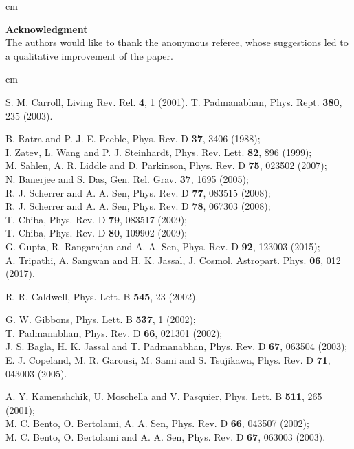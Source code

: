 \documentclass[11pt]{article}
\begin{document}
 cm


{\bf Acknowledgment}\\
The authors would like to thank the anonymous referee, whose suggestions led to a qualitative improvement of the paper.








 cm
\begin{thebibliography}{}

  
S. M. Carroll, Living Rev. Rel. {\bf 4}, 1 (2001).
T. Padmanabhan, Phys. Rept. {\bf 380}, 235 (2003).

B. Ratra and P. J. E. Peeble, Phys. Rev. D {\bf 37}, 3406 (1988);\\
               I. Zatev, L. Wang and P. J. Steinhardt, Phys. Rev. Lett. {\bf 82}, 896 (1999);\\
               M. Sahlen, A. R. Liddle and D. Parkinson, Phys. Rev. D {\bf 75}, 023502 (2007);\\
               N. Banerjee and S. Das, Gen. Rel. Grav. {\bf 37}, 1695 (2005); \\
               R. J. Scherrer and A. A. Sen, Phys. Rev. D {\bf 77}, 083515 (2008);\\
               R. J. Scherrer and A. A. Sen, Phys. Rev. D {\bf 78}, 067303 (2008);\\
               T. Chiba, Phys. Rev. D {\bf 79}, 083517 (2009);\\
               T. Chiba, Phys. Rev. D {\bf 80}, 109902 (2009);\\
               G. Gupta, R. Rangarajan and A. A. Sen, Phys. Rev. D {\bf 92}, 123003 (2015);\\
               A. Tripathi, A. Sangwan and H. K. Jassal, J. Cosmol. Astropart. Phys. {\bf 06}, 012 (2017).

R. R. Caldwell, Phys. Lett. B {\bf 545}, 23 (2002).


G. W. Gibbons, Phys. Lett. B {\bf 537}, 1 (2002);\\
                T. Padmanabhan, Phys. Rev. D {\bf 66}, 021301 (2002);\\
                J. S. Bagla, H. K. Jassal and T. Padmanabhan, Phys. Rev. D {\bf 67}, 063504 (2003);\\
                E. J. Copeland, M. R. Garousi, M. Sami and S. Tsujikawa, Phys. Rev. D {\bf 71}, 043003 (2005).

A. Y. Kamenshchik, U. Moschella and V. Pasquier, Phys. Lett. B {\bf 511}, 265 (2001);\\
              M. C. Bento, O. Bertolami, A. A. Sen, Phys. Rev. D {\bf 66}, 043507 (2002);\\
              M. C. Bento, O. Bertolami and A. A. Sen, Phys. Rev. D {\bf 67}, 063003 (2003).




\end{thebibliography}
\end{document}
